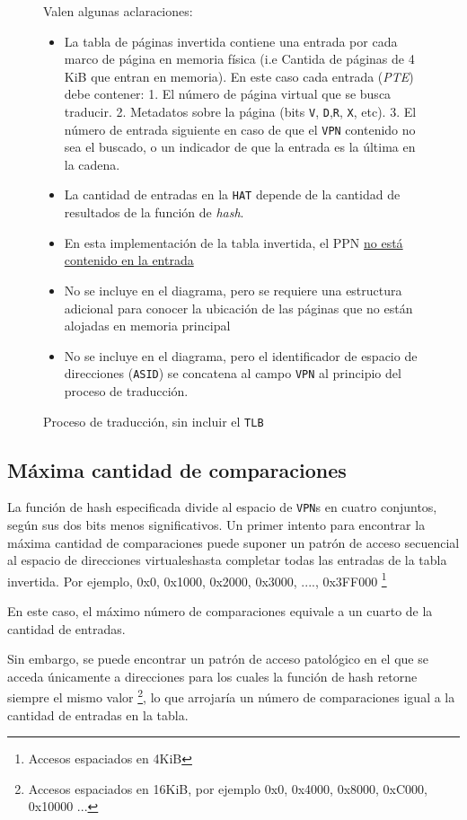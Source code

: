 \documentclass{article}
\begin{document}
\begin{figure}[!ht]
\begin{tikzpicture}[x=0.75pt,y=0.75pt,yscale=-1,xscale=1]
\end{tikzpicture}
Valen algunas aclaraciones:
\begin{itemize}
\item La tabla de páginas invertida contiene una entrada por cada marco de página en memoria física (i.e Cantida de páginas de 4 KiB que entran en memoria). En este caso cada entrada (\textit{PTE}) debe contener: 1. El número de página virtual que se busca traducir. 2. Metadatos sobre la página (bits \texttt{V}, \texttt{D},\texttt{R}, \texttt{X}, etc). 3. El número de entrada siguiente en caso de que el \texttt{VPN} contenido no sea el buscado, o un indicador de que la entrada es la última en la cadena.
\item La cantidad de entradas en la \texttt{HAT} depende de la cantidad de resultados de la función de \textit{hash}.
\item En esta implementación de la tabla invertida, el PPN \underline{no está contenido en la entrada}
\item No se incluye en el diagrama, pero se requiere una estructura adicional para conocer la ubicación de las páginas que no están alojadas en memoria principal
\item No se incluye en el diagrama, pero el identificador de espacio de direcciones (\texttt{ASID}) se concatena al campo \texttt{VPN} al principio del proceso de traducción.  
\end{itemize}

\caption{\label{ref::trad-no-tlb} Proceso de traducción, sin incluir el \texttt{TLB}}
\end{figure}


\subsection{Máxima cantidad de comparaciones}
La función de hash especificada divide al espacio de \texttt{VPN}s en cuatro conjuntos, según sus dos bits menos significativos. Un primer intento para encontrar la máxima cantidad de comparaciones puede suponer un patrón de acceso secuencial al espacio de direcciones virtualeshasta completar todas las entradas de la tabla invertida. 
Por ejemplo, 
0x0, 0x1000, 0x2000, 0x3000, ...., 0x3FF000 \footnote{Accesos espaciados en 4KiB}

En este caso, el máximo número de comparaciones equivale a un cuarto de la cantidad de entradas.

Sin embargo, se puede encontrar un patrón de acceso patológico en el que se acceda únicamente a direcciones para los cuales la función de hash retorne siempre el mismo valor \footnote {Accesos espaciados en 16KiB, por ejemplo 0x0, 0x4000, 0x8000, 0xC000, 0x10000 ... }, lo que arrojaría un número de comparaciones igual a la cantidad de entradas en la tabla.
\end{document}
